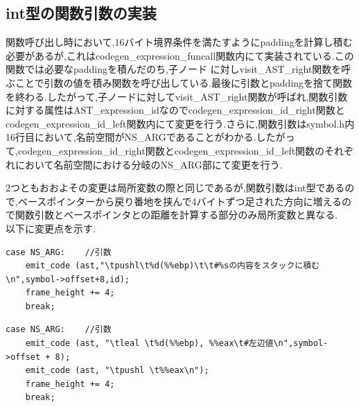 \documentclass[10pt]{jsarticle}
\begin{document}
\subsection{int型の関数引数の実装}
関数呼び出し時において,16バイト境界条件を満たすようにpaddingを計算し積む必要があるが,これはcodegen\_expression\_funcall関数内にて実装されている.この関数では必要なpaddingを積んだのち,子ノード に対しvisit\_AST\_right関数を呼ぶことで引数の値を積み関数を呼び出している.最後に引数とpaddingを捨て関数を終わる.したがって,子ノードに対してvisit\_AST\_right関数が呼ばれ,関数引数に対する属性はAST\_expression\_idなのでcodegen\_expression\_id\_right関数とcodegen\_expression\_id\_left関数内にて変更を行う.さらに,関数引数はsymbol.h内16行目において,名前空間がNS\_ARGであることがわかる.したがって,codegen\_expression\_id\_right関数とcodegen\_expression\_id\_left関数のそれぞれにおいて名前空間における分岐のNS\_ARG部にて変更を行う.
\par 2つともおおよその変更は局所変数の際と同じであるが,関数引数はint型であるので,ベースポインターから戻り番地を挟んで4バイトずつ足された方向に増えるので関数引数とベースポインタとの距離を計算する部分のみ局所変数と異なる.\\
以下に変更点を示す.
\begin{lstlisting}[caption=codegen\_expression\_id\_right関数内における関数引数]
  case NS_ARG:    //引数
    emit_code (ast,"\tpushl\t%d(%%ebp)\t\t#%sの内容をスタックに積む\n",symbol->offset+8,id);
    frame_height += 4;
    break;
\end{lstlisting}

\begin{lstlisting}[caption=codegen\_expression\_id\_left関数内における関数引数]
  case NS_ARG:    //引数
    emit_code (ast, "\tleal \t%d(%%ebp), %%eax\t#左辺値\n",symbol->offset + 8);
    emit_code (ast, "\tpushl \t%%eax\n");
    frame_height += 4;
    break;
\end{lstlisting}
\end{document}
